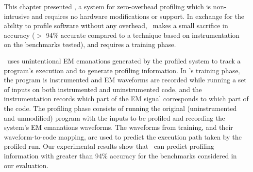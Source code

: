 This chapter presented \zop, a system for zero-overhead profiling which is non-intrusive and requires no hardware modifications or support. In exchange for the ability to profile software without any overhead, \zop\ makes a small sacrifice in accuracy ($>$ 94\% accurate compared to a technique based on instrumentation on the benchmarks tested), and requires a training phase.

\zop\ uses unintentional EM emanations generated by the profiled system to track a program's execution and to generate profiling information. In \zop's training phase, the program is instrumented and EM waveforms are recorded while running a set of inputs on both instrumented and uninstrumented code, and the instrumentation records which part of the EM signal corresponds to which part of the code. The profiling phase consists of running the original (uninstrumented and unmodified) program with the inputs to be profiled and recording the system's EM emanations waveforms. The waveforms from training, and their waveform-to-code mapping, are used to predict the execution path taken by the profiled run. Our experimental results show that \zop\ can predict profiling information with greater than 94\% accuracy for the benchmarks considered in our evaluation.

